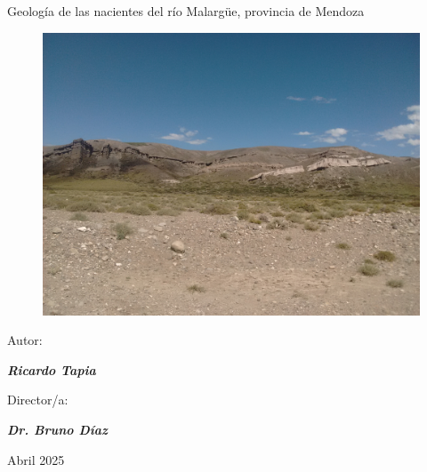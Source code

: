 \documentclass[11pt,a4paper]{article}
\begin{document}
\begin{titlepage}



\centering


\vspace{2cm}
{\huge Geología de las nacientes del río Malargüe, provincia de Mendoza \par} %
\begin{figure}[h]
    \centering
    \includegraphics[width=.7\linewidth]{IMG_20160223_152527650.jpg}
    \label{fig:enter-label}
\end{figure}
\vfill
{\Large Autor: \par}
{\Large \textbf{\emph{Ricardo Tapia}} \par}%
\vspace{0.5cm}
{\Large Director/a: \par}
{\Large \textbf{\emph{Dr. Bruno Díaz}} \par}%
\vfill
{\Large Abril 2025 \par}
\end{titlepage}

\fancyhead{}
\fancyhf{}
\fancyfoot{}
\newpage
\end{document}
